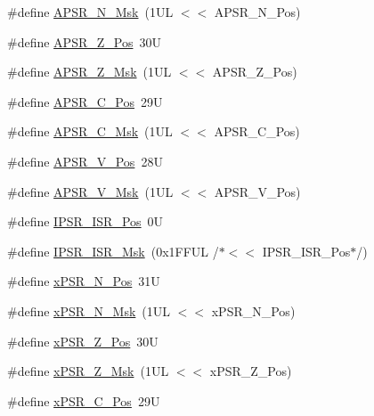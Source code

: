 \begin{DoxyCompactItemize}
\item 
\#define \hyperlink{group___c_m_s_i_s___c_o_r_e_gadbc2cf55a026f661b53fadfcf822cef1}{A\+P\+S\+R\+\_\+\+N\+\_\+\+Msk}~(1\+U\+L $<$$<$ A\+P\+S\+R\+\_\+\+N\+\_\+\+Pos)
\item 
\#define \hyperlink{group___c_m_s_i_s___c_o_r_e_ga3661286d108b1aca308d7445685eae3a}{A\+P\+S\+R\+\_\+\+Z\+\_\+\+Pos}~30U
\item 
\#define \hyperlink{group___c_m_s_i_s___c_o_r_e_ga1deb4d1aa72bb83d1f79329406f15711}{A\+P\+S\+R\+\_\+\+Z\+\_\+\+Msk}~(1\+U\+L $<$$<$ A\+P\+S\+R\+\_\+\+Z\+\_\+\+Pos)
\item 
\#define \hyperlink{group___c_m_s_i_s___c_o_r_e_ga6cf72aa6f09a168f9e5beda1a4a887b9}{A\+P\+S\+R\+\_\+\+C\+\_\+\+Pos}~29U
\item 
\#define \hyperlink{group___c_m_s_i_s___c_o_r_e_ga6d47803fbad455bc10bd1ce59f2f335d}{A\+P\+S\+R\+\_\+\+C\+\_\+\+Msk}~(1\+U\+L $<$$<$ A\+P\+S\+R\+\_\+\+C\+\_\+\+Pos)
\item 
\#define \hyperlink{group___c_m_s_i_s___c_o_r_e_gac62830f67679ccd11658c4172c3e6ea7}{A\+P\+S\+R\+\_\+\+V\+\_\+\+Pos}~28U
\item 
\#define \hyperlink{group___c_m_s_i_s___c_o_r_e_ga33305d6701356bff6890b315fe8b5489}{A\+P\+S\+R\+\_\+\+V\+\_\+\+Msk}~(1\+U\+L $<$$<$ A\+P\+S\+R\+\_\+\+V\+\_\+\+Pos)
\item 
\#define \hyperlink{group___c_m_s_i_s___c_o_r_e_ga0e34027584d02c43811ae908a5ca9adf}{I\+P\+S\+R\+\_\+\+I\+S\+R\+\_\+\+Pos}~0U
\item 
\#define \hyperlink{group___c_m_s_i_s___c_o_r_e_gaf013a4579a64d1f21f56ea9f1b33ab56}{I\+P\+S\+R\+\_\+\+I\+S\+R\+\_\+\+Msk}~(0x1\+F\+F\+U\+L /$\ast$$<$$<$ I\+P\+S\+R\+\_\+\+I\+S\+R\+\_\+\+Pos$\ast$/)
\item 
\#define \hyperlink{group___c_m_s_i_s___c_o_r_e_ga031eb1b8ebcdb3d602d0b9f2ec82a7ae}{x\+P\+S\+R\+\_\+\+N\+\_\+\+Pos}~31U
\item 
\#define \hyperlink{group___c_m_s_i_s___c_o_r_e_gaf600f4ff41b62cf2f3b0a59b6d2e93d6}{x\+P\+S\+R\+\_\+\+N\+\_\+\+Msk}~(1\+U\+L $<$$<$ x\+P\+S\+R\+\_\+\+N\+\_\+\+Pos)
\item 
\#define \hyperlink{group___c_m_s_i_s___c_o_r_e_ga5869dd608eea73c80f0567d781d2230b}{x\+P\+S\+R\+\_\+\+Z\+\_\+\+Pos}~30U
\item 
\#define \hyperlink{group___c_m_s_i_s___c_o_r_e_ga907599209fba99f579778e662021c4f2}{x\+P\+S\+R\+\_\+\+Z\+\_\+\+Msk}~(1\+U\+L $<$$<$ x\+P\+S\+R\+\_\+\+Z\+\_\+\+Pos)
\item 
\#define \hyperlink{group___c_m_s_i_s___c_o_r_e_ga14adb79b91f6634b351a1b57394e2db6}{x\+P\+S\+R\+\_\+\+C\+\_\+\+Pos}~29U

\end{DoxyCompactItemize}
